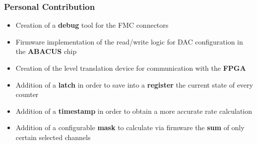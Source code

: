 \documentclass[aspectratio=169]{beamer}
\begin{document}
	
	\begin{frame}
	\frametitle{Personal Contribution}
	\begin{itemize}
		\item {\color{teal} Creation of a \textbf{debug} tool for the FMC connectors}
		\item {\color{teal} Firmware implementation of the read/write logic for DAC configuration in the \textbf{ABACUS} chip}
		\item {\color{teal} Creation of the level translation device for communication with the \textbf{FPGA}}
		\item {\color{red} Addition of a \textbf{latch} in order to save into a \textbf{register} the current state of every counter}
		\item {\color{red} Addition of a \textbf{timestamp} in order to obtain a more accurate rate calculation}
		\item {\color{red} Addition of a configurable \textbf{mask} to calculate via firmware the \textbf{sum} of only certain selected channels}
	\end{itemize}
	\end{frame}
	
\end{document}
